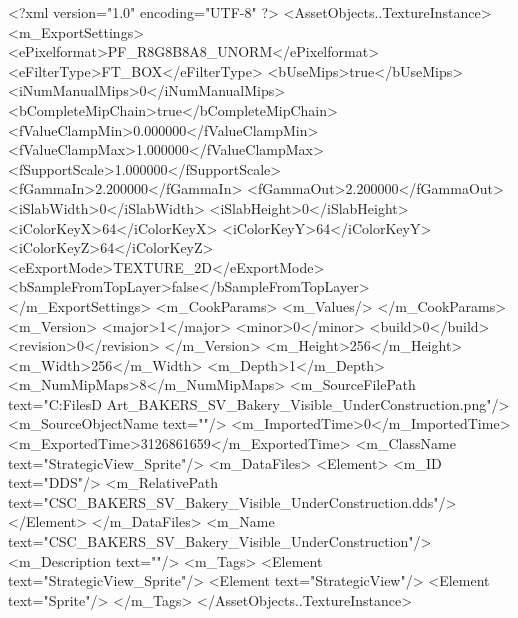 <?xml version="1.0" encoding="UTF-8" ?>
<AssetObjects..TextureInstance>
	<m_ExportSettings>
		<ePixelformat>PF_R8G8B8A8_UNORM</ePixelformat>
		<eFilterType>FT_BOX</eFilterType>
		<bUseMips>true</bUseMips>
		<iNumManualMips>0</iNumManualMips>
		<bCompleteMipChain>true</bCompleteMipChain>
		<fValueClampMin>0.000000</fValueClampMin>
		<fValueClampMax>1.000000</fValueClampMax>
		<fSupportScale>1.000000</fSupportScale>
		<fGammaIn>2.200000</fGammaIn>
		<fGammaOut>2.200000</fGammaOut>
		<iSlabWidth>0</iSlabWidth>
		<iSlabHeight>0</iSlabHeight>
		<iColorKeyX>64</iColorKeyX>
		<iColorKeyY>64</iColorKeyY>
		<iColorKeyZ>64</iColorKeyZ>
		<eExportMode>TEXTURE_2D</eExportMode>
		<bSampleFromTopLayer>false</bSampleFromTopLayer>
	</m_ExportSettings>
	<m_CookParams>
		<m_Values/>
	</m_CookParams>
	<m_Version>
		<major>1</major>
		<minor>0</minor>
		<build>0</build>
		<revision>0</revision>
	</m_Version>
	<m_Height>256</m_Height>
	<m_Width>256</m_Width>
	<m_Depth>1</m_Depth>
	<m_NumMipMaps>8</m_NumMipMaps>
	<m_SourceFilePath text="C:\Users\Shadow\Desktop\Working Files\2D Art\Quarters\Bakers\StrategicView\CSC_BAKERS_SV_Bakery_Visible_UnderConstruction.png"/>
	<m_SourceObjectName text=""/>
	<m_ImportedTime>0</m_ImportedTime>
	<m_ExportedTime>3126861659</m_ExportedTime>
	<m_ClassName text="StrategicView_Sprite"/>
	<m_DataFiles>
		<Element>
			<m_ID text="DDS"/>
			<m_RelativePath text="CSC_BAKERS_SV_Bakery_Visible_UnderConstruction.dds"/>
		</Element>
	</m_DataFiles>
	<m_Name text="CSC_BAKERS_SV_Bakery_Visible_UnderConstruction"/>
	<m_Description text=""/>
	<m_Tags>
		<Element text="StrategicView_Sprite"/>
		<Element text="StrategicView"/>
		<Element text="Sprite"/>
	</m_Tags>
</AssetObjects..TextureInstance>

